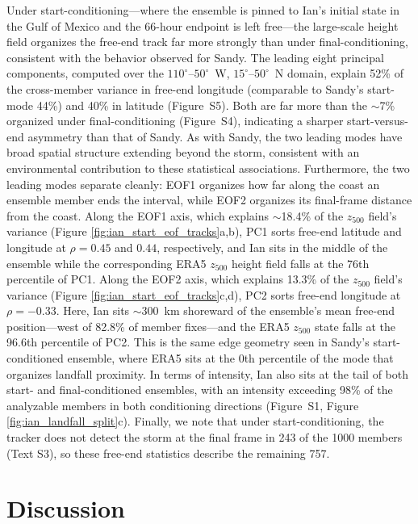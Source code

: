 \documentclass[final]{agujournal2019}
\begin{document}
Under start-conditioning---where the ensemble is pinned to Ian's initial state in the Gulf of Mexico and the 66-hour endpoint is left free---the large-scale height field organizes the free-end track far more strongly than under final-conditioning, consistent with the behavior observed for Sandy. The leading eight principal components, computed over the $110^{\circ}$--$50^{\circ}$~W, $15^{\circ}$--$50^{\circ}$~N domain, explain 52\% of the cross-member variance in free-end longitude (comparable to Sandy's start-mode 44\%) and 40\% in latitude (Figure~S5). Both are far more than the $\sim$7\% organized under final-conditioning (Figure~S4), indicating a sharper start-versus-end asymmetry than that of Sandy. As with Sandy, the two leading modes have broad spatial structure extending beyond the storm, consistent with an environmental contribution to these statistical associations. Furthermore, the two leading modes separate cleanly: EOF1 organizes how far along the coast an ensemble member ends the interval, while EOF2 organizes its final-frame distance from the coast. Along the EOF1 axis, which explains $\sim$18.4\% of the $z_{500}$ field's variance (Figure \ref{fig:ian_start_eof_tracks}a,b), PC1 sorts free-end latitude and longitude at $\rho = 0.45$ and $0.44$, respectively, and Ian sits in the middle of the ensemble while the corresponding ERA5 $z_{500}$ height field falls at the 76th percentile of PC1. Along the EOF2 axis, which explains 13.3\% of the $z_{500}$ field's variance (Figure \ref{fig:ian_start_eof_tracks}c,d), PC2 sorts free-end longitude at $\rho = -0.33$. Here, Ian sits ${\sim}300$~km shoreward of the ensemble's mean free-end position---west of 82.8\% of member fixes---and the ERA5 $z_{500}$ state falls at the 96.6th percentile of PC2. This is the same edge geometry seen in Sandy's start-conditioned ensemble, where ERA5 sits at the 0th percentile of the mode that organizes landfall proximity. In terms of intensity, Ian also sits at the tail of both start- and final-conditioned ensembles, with an intensity exceeding 98\% of the analyzable members in both conditioning directions (Figure~S1, Figure \ref{fig:ian_landfall_split}c). Finally, we note that under start-conditioning, the tracker does not detect the storm at the final frame in 243 of the 1000 members (Text S3), so these free-end statistics describe the remaining 757.

\section{Discussion}
\end{document}
